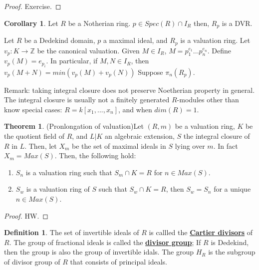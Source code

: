 \documentclass{article}
\theoremstyle{definition}
\newtheorem{theorem}{Theorem}[section]
\theoremstyle{definition}
\theoremstyle{definition}
\theoremstyle{definition}
\theoremstyle{definition}
\newtheorem{definition}{Definition}[section]
\theoremstyle{definition}
\newtheorem{corollary}{Corollary}[theorem]
\theoremstyle{definition}
\begin{document}
\begin{proof}
    Exercise.
\end{proof}


\begin{tcolorbox}[colback=green!5!white,colframe=green!30!white]
\begin{corollary}
Let $R$ be a Notherian ring. $p\in Spec(R)\cap I_R$ then, $R_p$ is a DVR.
\end{corollary}
\end{tcolorbox}

Let $R$ be a Dedekind domain, $p$ a maximal ideal, and $R_p$ is a valuation ring. Let $v_p: K\to \mathbb{Z}$ be the canonical valuation. Given $M\in I_R$, $M=p_1^{e_1}...p_n^{e_n}$. Define $v_p(M)=e_{p_i}$. In particular, if $M,N\in I_R$, then $v_p(M+N)=min(v_p(M)+v_p(N))$ Suppose $\pi_n(R_p)$. 

Remark: taking integral closure does not preserve Noetherian property in general. The integral closure is usually not a finitely generated $R$-modules other than know special cases: $R=k[x_1,...,x_n]$, and when $dim(R)=1$.


\begin{tcolorbox}[colback=red!5!white,colframe=red!30!white]
\begin{theorem}
(Pronlongation of valuation)Let $(R,m)$ be a valuation ring, $K$ be the quotient field of $R$, and $L|K$ an algebraic extension, $S$ the integral closure of $R$ in $L$. Then, let $X_m$ be the set of maximal ideals in $S$ lying over $m$. In fact $X_m=Max(S)$. Then, the following hold:
\begin{enumerate}
    \item $S_n$ is a valuation ring such that $S_m\cap K=R$ for $n\in Max(S)$.  
    \item $S_w$ is a valuation ring of $S$ such that $S_w\cap K=R$, then $S_w=S_n$ for a unique $n\in Max(S)$.
\end{enumerate}
\end{theorem}
\end{tcolorbox}
\begin{proof}
    HW. 
\end{proof}




\begin{tcolorbox}[colback=purple!5!white,colframe=purple!75!black]
\begin{definition}
The set of invertible ideals of $R$ is callled the \underline{\textbf{Cartier divisors}} of $R$. The group of fractional ideals is called the \underline{\textbf{divisor group}}; If $R$ is Dedekind, then the group is also the group of invertible idals. The group $H_R$ is the subgroup of divisor group of $R$ that consists of principal ideals. 
\end{definition}
\end{tcolorbox}
\end{document}
